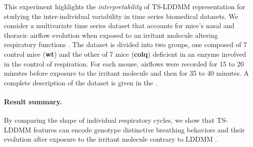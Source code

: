 
This experiment highlights the \textit{interpretability} of TS-LDDMM representation for studying the inter-individual variability in time series biomedical datasets. We consider a multivariate time series dataset that accounts for mice's nasal and thoracic airflow evolution when exposed to an irritant molecule altering respiratory functions \cite{nervo2019respiratory}.
The dataset is divided into two groups, one composed of 7 control mice (\textbf{wt}) and the other of 7 mice (\textbf{colq}) deficient in an enzyme involved in the control of respiration. For each mouse, airflows were recorded for 15 to 20 minutes before exposure to the irritant molecule and then for 35 to 40 minutes. A complete 
description of the dataset is given in the .
\vspace{-1ex}
\paragraph{Result summary.} By comparing the shape of individual respiratory cycles, we show that TS-LDDMM features can encode genotype distinctive breathing behaviors and their evolution after exposure to the irritant molecule contrary to LDDMM \cite{glaunes2008large}. 
\vspace{-1ex}
